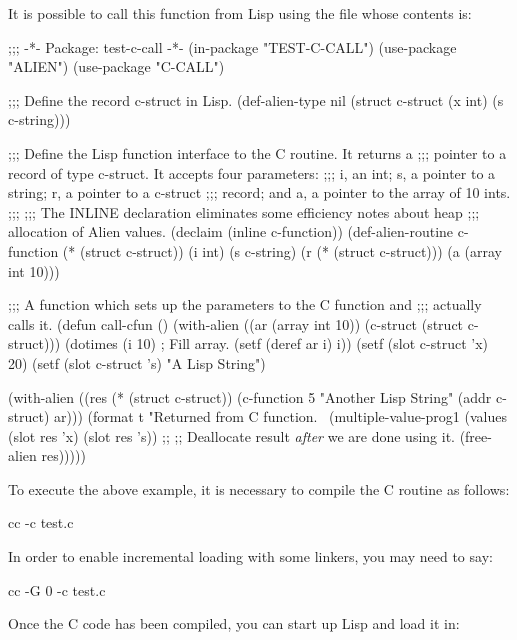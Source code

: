 It is possible to call this function from Lisp using the file 
whose contents is:

\begin{lisp}
;;; -*- Package: test-c-call -*-
(in-package "TEST-C-CALL")
(use-package "ALIEN")
(use-package "C-CALL")

;;; Define the record c-struct in Lisp.
(def-alien-type nil
    (struct c-struct
            (x int)
            (s c-string)))

;;; Define the Lisp function interface to the C routine.  It returns a
;;; pointer to a record of type c-struct.  It accepts four parameters:
;;; i, an int; s, a pointer to a string; r, a pointer to a c-struct
;;; record; and a, a pointer to the array of 10 ints.
;;;
;;; The INLINE declaration eliminates some efficiency notes about heap
;;; allocation of Alien values.
(declaim (inline c-function))
(def-alien-routine c-function
    (* (struct c-struct))
  (i int)
  (s c-string)
  (r (* (struct c-struct)))
  (a (array int 10)))

;;; A function which sets up the parameters to the C function and
;;; actually calls it.
(defun call-cfun ()
  (with-alien ((ar (array int 10))
               (c-struct (struct c-struct)))
    (dotimes (i 10)                     ; Fill array.
      (setf (deref ar i) i))
    (setf (slot c-struct 'x) 20)
    (setf (slot c-struct 's) "A Lisp String")

    (with-alien ((res (* (struct c-struct))
                      (c-function 5 "Another Lisp String" (addr c-struct) ar)))
      (format t "Returned from C function.~%
      (multiple-value-prog1
          (values (slot res 'x)
                  (slot res 's))
        ;;              
        ;; Deallocate result {\em after} we are done using it.
        (free-alien res)))))
\end{lisp}

To execute the above example, it is necessary to compile the C routine as
follows:

\begin{example}
cc -c test.c
\end{example}

In order to enable incremental loading with some linkers, you may need to say:

\begin{example}
cc -G 0 -c test.c
\end{example}

Once the C code has been compiled, you can start up Lisp and load it in:

